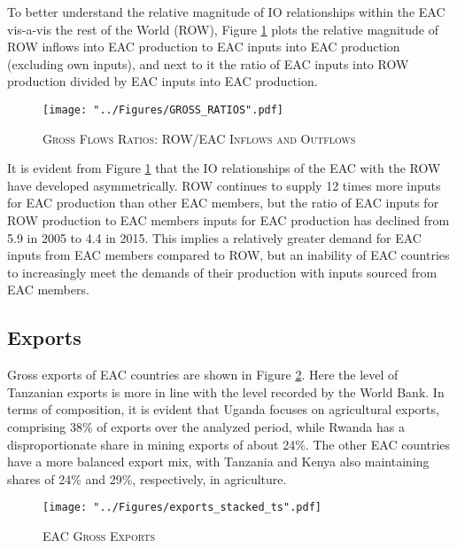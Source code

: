 \documentclass[a4paper]{article}
\begin{document}
To better understand the relative magnitude of IO relationships within the EAC vis-a-vis the rest of the World (ROW), Figure \ref{fig:GR} plots the relative magnitude of ROW inflows into EAC production to EAC inputs into EAC production (excluding own inputs), and next to it the ratio of EAC inputs into ROW production divided by EAC inputs into EAC production. 

\begin{figure}[h!]
\centering
\caption{\label{fig:GR}\textsc{Gross Flows Ratios: ROW/EAC Inflows and Outflows}}
\texttt{[image: "../Figures/GROSS\_RATIOS".pdf]} %
\end{figure}
\FloatBarrier

It is evident from Figure \ref{fig:GR} that the IO relationships of the EAC with the ROW have developed asymmetrically. ROW continues to supply 12 times more inputs for EAC production than other EAC members, but the ratio of EAC inputs for ROW production to EAC members inputs for EAC production has declined from 5.9 in 2005 to 4.4 in 2015. This implies a relatively greater demand for EAC inputs from EAC members compared to ROW, but an inability of EAC countries to increasingly meet the demands of their production with inputs sourced from EAC members. 


\subsection{Exports}

Gross exports of EAC countries are shown in Figure \ref{fig:exp}. Here the level of Tanzanian exports is more in line with the level recorded by the World Bank. In terms of composition, it is evident that Uganda focuses on agricultural exports, comprising 38\% of exports over the analyzed period, while Rwanda has a disproportionate share in mining exports of about 24\%. The other EAC countries have a more balanced export mix, with Tanzania and Kenya also maintaining shares of 24\% and 29\%, respectively, in agriculture. 


\begin{figure}[h!]
\centering
\caption{\label{fig:exp}\textsc{EAC Gross Exports}}
\texttt{[image: "../Figures/exports\_stacked\_ts".pdf]} %
\end{figure}
\FloatBarrier
\end{document}
